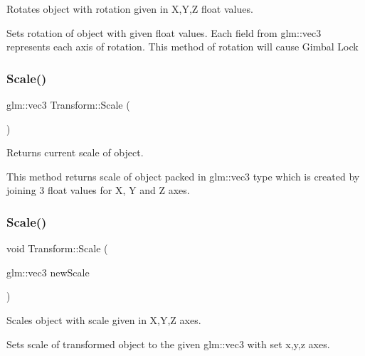 Rotates object with rotation given in X,Y,Z float values. 

Sets rotation of object with given float values. Each field from glm\+::vec3 represents each axis of rotation. This method of rotation will cause Gimbal Lock \mbox{\label{class_transform_a60238a62017be874dea8514a4b172fcc}} 
\subsubsection{\texorpdfstring{Scale()}{Scale()}\hspace{0.1cm}{\footnotesize\ttfamily [1/3]}}
{\footnotesize\ttfamily glm\+::vec3 Transform\+::\+Scale (\begin{DoxyParamCaption}{ }\end{DoxyParamCaption})\hspace{0.3cm}{\ttfamily [inline]}}



Returns current scale of object. 

This method returns scale of object packed in glm\+::vec3 type which is created by joining 3 float values for X, Y and Z axes. \mbox{\label{class_transform_ab4af0a98c37f0284074e30e3d6d2ca41}} 
\subsubsection{\texorpdfstring{Scale()}{Scale()}\hspace{0.1cm}{\footnotesize\ttfamily [2/3]}}
{\footnotesize\ttfamily void Transform\+::\+Scale (\begin{DoxyParamCaption}\item[{glm\+::vec3}]{new\+Scale }\end{DoxyParamCaption})\hspace{0.3cm}{\ttfamily [inline]}}



Scales object with scale given in X,Y,Z axes. 

Sets scale of transformed object to the given glm\+::vec3 with set x,y,z axes. \mbox{\label{class_transform_a0a30b57dd24261f559604ea64e69e0f9}} 
